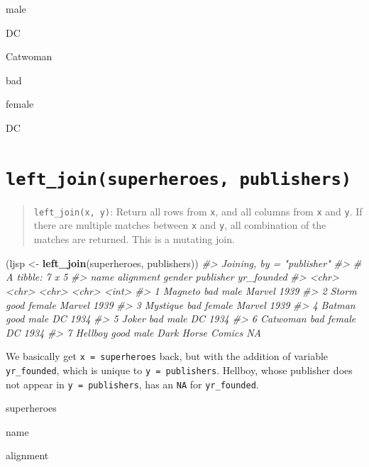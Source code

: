 \documentclass[
]{book}
\newenvironment{Shaded}{\begin{snugshade}}{\end{snugshade}}
\newcommand{\CommentTok}[1]{\textcolor[rgb]{0.56,0.35,0.01}{\textit{#1}}}
\newcommand{\KeywordTok}[1]{\textcolor[rgb]{0.13,0.29,0.53}{\textbf{#1}}}
\newcommand{\NormalTok}[1]{#1}
\newcommand{\StringTok}[1]{\textcolor[rgb]{0.31,0.60,0.02}{#1}}
\begin{document}
male

DC

Catwoman

bad

female

DC

\hypertarget{left_joinsuperheroes-publishers}{%
\section{\texorpdfstring{\texttt{left\_join(superheroes,\ publishers)}}{left\_join(superheroes, publishers)}}\label{left_joinsuperheroes-publishers}}

\begin{quote}
\texttt{left\_join(x,\ y)}: Return all rows from \texttt{x}, and all columns from \texttt{x} and \texttt{y}. If there are multiple matches between \texttt{x} and \texttt{y}, all combination of the matches are returned. This is a mutating join.
\end{quote}

\begin{Shaded}
\begin{Highlighting}[]
\NormalTok{(ljsp <-}\StringTok{ }\KeywordTok{left_join}\NormalTok{(superheroes, publishers))}
\CommentTok{#> Joining, by = "publisher"}
\CommentTok{#> # A tibble: 7 x 5}
\CommentTok{#>   name     alignment gender publisher         yr_founded}
\CommentTok{#>   <chr>    <chr>     <chr>  <chr>                  <int>}
\CommentTok{#> 1 Magneto  bad       male   Marvel                  1939}
\CommentTok{#> 2 Storm    good      female Marvel                  1939}
\CommentTok{#> 3 Mystique bad       female Marvel                  1939}
\CommentTok{#> 4 Batman   good      male   DC                      1934}
\CommentTok{#> 5 Joker    bad       male   DC                      1934}
\CommentTok{#> 6 Catwoman bad       female DC                      1934}
\CommentTok{#> 7 Hellboy  good      male   Dark Horse Comics         NA}
\end{Highlighting}
\end{Shaded}

We basically get \texttt{x\ =\ superheroes} back, but with the addition of variable \texttt{yr\_founded}, which is unique to \texttt{y\ =\ publishers}. Hellboy, whose publisher does not appear in \texttt{y\ =\ publishers}, has an \texttt{NA} for \texttt{yr\_founded}.

superheroes

name

alignment
\end{document}
